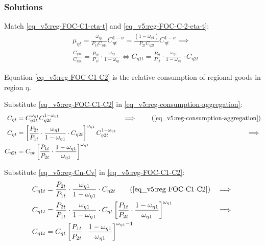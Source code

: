 \documentclass[../thesis.tex]{subfiles}
\begin{document}
\subsubsection*{Solutions}

Match \ref{eq_v5:reg-FOC-C1-eta-t} and \ref{eq_v5:reg-FOC-C-2-eta-t}:
\begin{align}
	& \mu_{\eta t} = \frac{\omega_{\eta 1}}{P_{1 t} C_{\eta 1 t}} C_{\eta t}^{1 -\sigma} = \frac{(1 -\omega_{\eta 1})}{P_{2 t} C_{\eta 2 t}} C_{\eta t}^{1 -\sigma} \implies \nonumber \\
	& \frac{C_{\eta 1 t}}{C_{\eta 2 t}} = \frac{P_{2 t}}{P_{1 t}} \cdot \frac{\omega_{\eta 1}}{1 -\omega_{\eta 1}} \iff C_{\eta 1 t} = \frac{P_{2 t}}{P_{1 t}} \cdot \frac{\omega_{\eta 1}}{1 -\omega_{\eta 1}} \cdot C_{\eta 2 t} \label{eq_v5:reg-FOC-C1-C2}
\end{align}

Equation \ref{eq_v5:reg-FOC-C1-C2} is the relative consumption of regional goods in region $\eta$.

Substitute \ref{eq_v5:reg-FOC-C1-C2} in \ref{eq_v5:reg-consumption-aggregation}:
\begin{alignat}{2}
	C_{\eta t} &= C_{\eta 1 t}^{\omega_{\eta 1}} C_{\eta 2 t}^{1-\omega_{\eta 1}} &\implies \tag{\ref{eq_v5:reg-consumption-aggregation}} \\
	C_{\eta t} &= \left[ \frac{P_{2 t}}{P_{1 t}} \cdot \frac{\omega_{\eta 1}}{1 -\omega_{\eta 1}} \cdot C_{\eta 2 t} \right]^{\omega_{\eta 1}} C_{\eta 2 t}^{1-\omega_{\eta 1}} &\implies \nonumber \\
	C_{\eta 2 t} &= C_{\eta t} \left[ \frac{P_{1 t}}{P_{2 t}} \cdot \frac{1 -\omega_{\eta 1}}{\omega_{\eta 1}} \right]^{\omega_{\eta 1}} \label{eq_v5:reg-Cn-Cv}
\end{alignat}

Substitute \ref{eq_v5:reg-Cn-Cv} in \ref{eq_v5:reg-FOC-C1-C2}:
\begin{alignat}{2}
	C_{\eta 1 t} &= \frac{P_{2 t}}{P_{1 t}} \cdot \frac{\omega_{\eta 1}}{1 -\omega_{\eta 1}} \cdot C_{\eta 2 t} \tag{\ref{eq_v5:reg-FOC-C1-C2}} &\implies \nonumber \\
	C_{\eta 1 t} &= \frac{P_{2 t}}{P_{1 t}} \cdot \frac{\omega_{\eta 1}}{1 -\omega_{\eta 1}} \cdot C_{\eta t} \left[ \frac{P_{1 t}}{P_{2 t}} \cdot \frac{1 -\omega_{\eta 1}}{\omega_{\eta 1}} \right]^{\omega_{\eta 1}} &\implies \nonumber \\
	C_{\eta 1 t} &= C_{\eta t} \left[ \frac{P_{1 t}}{P_{2 t}} \cdot \frac{1 -\omega_{\eta 1}}{\omega_{\eta 1}} \right]^{\omega_{\eta 1} -1} \label{eq_v5:reg-Cn-Cn}
\end{alignat}
\end{document}
